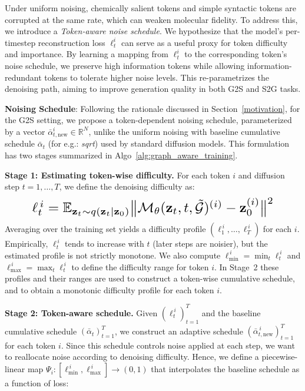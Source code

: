 \noindent Under uniform noising, chemically salient tokens and
simple syntactic tokens are corrupted at the same rate, which can weaken molecular fidelity. To address this, we introduce a \emph{Token-aware noise
schedule}. We hypothesize that the model’s per-timestep
reconstruction loss $\ell_t^i$ can serve as a useful proxy for token difficulty and importance. By learning a
mapping from $\ell_t^i$ to the corresponding token's noise schedule, we preserve high information tokens while allowing information-redundant tokens to tolerate higher noise levels. This re-parametrizes the denoising path, aiming to improve generation quality in both G2S and S2G tasks.

\noindent \textbf{Noising Schedule}\label{graph schedule}:
Following the rationale discussed in Section~\ref{motivation}, for the G2S setting, we propose a token-dependent noising schedule, parameterized by a vector $\bar{\alpha}_{t, \text{new}}^i \in \mathbb{R}^N$, unlike the uniform noising with baseline cumulative schedule $\bar{\alpha}_t$ (for e.g.: \textit{sqrt}) used by standard diffusion models. This formulation has two stages summarized in Algo~\ref{alg:graph_aware_training}.

\noindent \textbf{Stage 1: Estimating token-wise difficulty.}
For each token $i$ and diffusion step $t=1,\dots,T$, we
define the denoising difficulty as:
\begin{equation}
\label{eq:loss}
\resizebox{0.85\linewidth}{!}{$
    \ell_t^{\,i}
    =
    \mathbb{E}_{\mathbf{z}_t \sim q(\mathbf{z}_t \mid \mathbf{z}_0)}
    \big\|
    \mathcal{M}_\theta(\mathbf{z}_t, t, \tilde{\mathcal{G}})^{(i)}
    - \mathbf{z}_0^{(i)}
    \big\|^2
$}
\end{equation}
Averaging over the training set yields a difficulty profile
$(\ell_1^{\,i},\dots,\ell_T^{\,i})$ for each $i$. Empirically,
$\ell_t^{\,i}$ tends to increase with $t$ (later steps are noisier), but the estimated profile is not strictly monotone. We also compute $\ell_{\min}^{\,i}=\min_t \ell_t^{\,i}$ and $\ell_{\max}^{\,i}=\max_t \ell_t^{\,i}$ to define the difficulty range for token $i$.
In Stage~2 these profiles and their ranges are used to construct a token-wise cumulative schedule, and to obtain a monotonic difficulty profile for each token $i$.

\noindent\textbf{Stage 2: Token-aware schedule.}
Given $(\ell_t^{\,i})_{t=1}^T$ and the baseline cumulative schedule
$(\bar{\alpha}_t)_{t=1}^T$, we construct an adaptive schedule
$(\bar{\alpha}_{t,\mathrm{new}}^{\,i})_{t=1}^T$ for each token $i$. Since this schedule controls noise applied at each step, we want to reallocate noise according to denoising difficulty. Hence, we define a
piecewise-linear map $\Psi_i:[\ell_{\min}^{\,i},\ell_{\max}^{\,i}]\to(0,1)$
that interpolates the baseline schedule as a function of loss:

